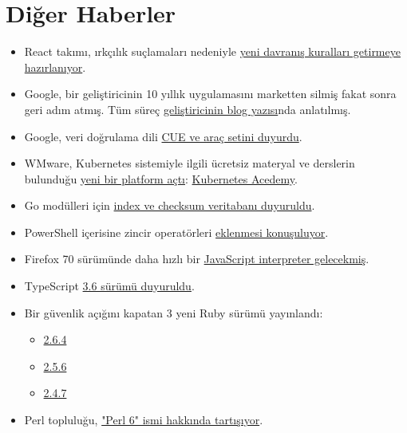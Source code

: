 \documentclass[11pt]{article}
\begin{document}
\section{Diğer Haberler}
\label{sec:org067a313}
\begin{itemize}
\item React takımı, ırkçılık suçlamaları nedeniyle \href{https://www.businessinsider.com/reactgate-react-facebook-code-of-conduct-twitter-2019-8}{yeni davranış kuralları
getirmeye hazırlanıyor}.
\item Google, bir geliştiricinin 10 yıllık uygulamasını marketten silmiş fakat
sonra geri adım atmış. Tüm süreç \href{https://medium.com/mmathieum/google-just-deleted-my-nearly-10-year-old-free-open-source-android-app-7fbc52edc50a}{geliştiricinin blog yazısı}nda anlatılmış.
\item Google, veri doğrulama dili \href{https://cuelang.org}{CUE ve araç setini duyurdu}.
\item WMware, Kubernetes sistemiyle ilgili ücretsiz materyal ve derslerin
bulunduğu \href{https://blogs.vmware.com/cloudnative/2019/08/27/introducing-kubernetes-academy-free-cloud-native-education-platform/}{yeni bir platform açtı}: \href{https://kubernetes.academy/}{Kubernetes Acedemy}.
\item Go modülleri için \href{https://blog.golang.org/module-mirror-launch}{index ve checksum veritabanı duyuruldu}.
\item PowerShell içerisine zincir operatörleri \href{https://github.com/PowerShell/PowerShell/pull/9849}{eklenmesi konuşuluyor}.
\item Firefox 70 sürümünde daha hızlı bir \href{https://hacks.mozilla.org/2019/08/the-baseline-interpreter-a-faster-js-interpreter-in-firefox-70/}{JavaScript interpreter gelecekmiş}.
\item TypeScript \href{https://devblogs.microsoft.com/typescript/announcing-typescript-3-6/\#stricter-generators}{3.6 sürümü duyuruldu}.
\item Bir güvenlik açığını kapatan 3 yeni Ruby sürümü yayınlandı:
\begin{itemize}
\item \href{https://www.ruby-lang.org/en/news/2019/08/28/ruby-2-6-4-released/}{2.6.4}
\item \href{https://www.ruby-lang.org/en/news/2019/08/28/ruby-2-5-6-released/}{2.5.6}
\item \href{https://www.ruby-lang.org/en/news/2019/08/28/ruby-2-4-7-released/}{2.4.7}
\end{itemize}
\item Perl topluluğu, \href{https://github.com/perl6/problem-solving/issues/81}{"Perl 6" ismi hakkında tartışıyor}.

\end{itemize}
\end{document}

